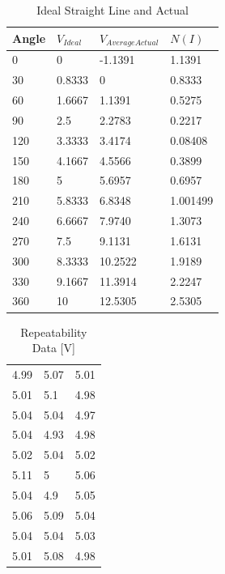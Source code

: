 \documentclass[a4,11pt]{article}
\begin{document}
\begin{table}[H]
	\centering
	\caption{Ideal Straight Line and Actual}
	\label{idealandact}
	\begin{tabular}{l|l|l|l}
		Angle  &  $V_{Ideal}$  &  $V_{Average Actual}$  &  $N(I)$  \\  \hline
		0  &  0  &  -1.1391  &  1.1391  \\
		30  &  0.8333  &  0  &  0.8333  \\
		60  &  1.6667  &  1.1391  &  0.5275  \\
		90  &  2.5  &  2.2783  &  0.2217  \\
		120  &  3.3333  &  3.4174  &  0.08408  \\
		150  &  4.1667  &  4.5566  &  0.3899  \\
		180  &  5  &  5.6957  &  0.6957  \\
		210  &  5.8333  &  6.8348  &  1.001499  \\
		240  &  6.6667  &  7.9740  &  1.3073  \\
		270  &  7.5  &  9.1131  &  1.6131  \\
		300  &  8.3333  &  10.2522  &  1.9189  \\
		330  &  9.1667  &  11.3914  &  2.2247  \\
		360  &  10  &  12.5305  &  2.5305  \\
	\end{tabular}
\end{table}

\begin{table}[H]
	\centering
	\caption{Repeatability Data [V]}
	\label{repeat}
	\begin{tabular}{l|l|l}
		4.99  &  5.07  &  5.01  \\
		5.01  &  5.1  &  4.98  \\
		5.04  &  5.04  &  4.97  \\
		5.04  &  4.93  &  4.98  \\
		5.02  &  5.04  &  5.02  \\
		5.11  &  5  &  5.06  \\
		5.04  &  4.9  &  5.05  \\
		5.06  &  5.09  &  5.04  \\
		5.04  &  5.04  &  5.03  \\
		5.01  &  5.08  &  4.98  \\
	\end{tabular}
\end{table}
\end{document}

